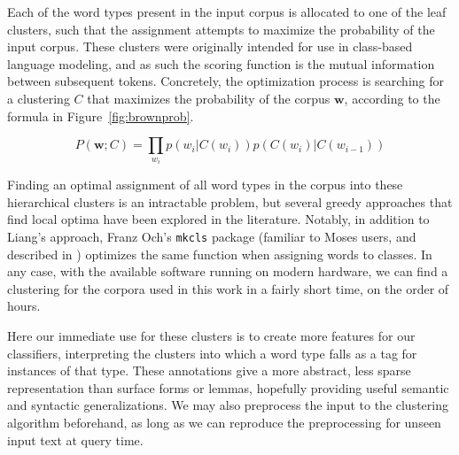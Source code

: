 Each of the word types present in the input corpus is allocated to one of the
leaf clusters, such that the assignment attempts to maximize the probability of
the input corpus.  These clusters were originally intended for use in
class-based language modeling, and as such the scoring function is the mutual
information between subsequent tokens. Concretely, the optimization process is
searching for a clustering $C$ that maximizes the probability of the corpus
$\boldsymbol{w}$, according to the formula in Figure~\ref{fig:brownprob}.

\begin{figure*}

  \begin{equation} \label{eq:brownclassprob}
  P(\boldsymbol{w}; C) = \prod_{w_i} p(w_i | C(w_i)) p(C(w_i) | C(w_{i-1}))
  \end{equation}

  \caption{The Brown clustering expression for the probability of a corpus with
  a specific clustering $C$. It is the product, for each token, of the
  probability of that token given its cluster, and the probability of that
  current cluster given the previous cluster. This is analogous to the
  ``emission" and ``transition" probabilities used in an HMM-based tagger.}
  \label{fig:brownprob}
\end{figure*}

Finding an optimal assignment of all word types in the corpus into these
hierarchical clusters is an intractable problem, but several greedy approaches
that find local optima have been explored in the literature.  Notably, in
addition to Liang's approach, Franz Och's \texttt{mkcls} package (familiar to
Moses users, and described in \cite{och1999efficient}) optimizes the same
function when assigning words to classes. In any case, with the available
software running on modern hardware, we can find a clustering for the corpora
used in this work in a fairly short time, on the order of hours.

Here our immediate use for these clusters is to create more features for our
classifiers, interpreting the clusters into which a word type falls as a tag
for instances of that type. These annotations give a more abstract, less sparse
representation than surface forms or lemmas, hopefully providing useful
semantic and syntactic generalizations. We may also preprocess the input to
the clustering algorithm beforehand, as long as we can reproduce the
preprocessing for unseen input text at query time.

